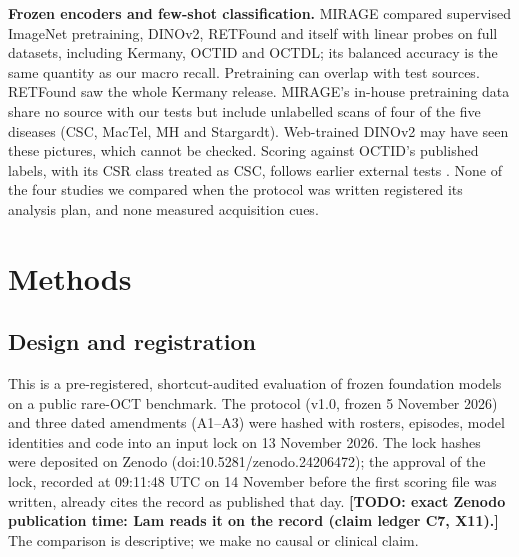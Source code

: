 \documentclass[conference]{IEEEtran}
\newcommand{\todo}[1]{\textbf{[TODO: #1]}}
\begin{document}
\textbf{Frozen encoders and few-shot classification.} MIRAGE \cite{MIRAGE2025} compared supervised ImageNet pretraining, DINOv2, RETFound and itself with linear probes on full datasets, including Kermany, OCTID and OCTDL; its balanced accuracy is the same quantity as our macro recall. Pretraining can overlap with test sources. RETFound saw the whole Kermany release. MIRAGE's in-house pretraining data share no source with our tests but include unlabelled scans of four of the five diseases (CSC, MacTel, MH and Stargardt). Web-trained DINOv2 may have seen these pictures, which cannot be checked.
Scoring against OCTID's \cite{OCTID2020} published labels, with its CSR class treated as CSC, follows earlier external tests \cite{TVST2026,EyeDiff2026}. None of the four studies we compared when the protocol was written registered its analysis plan, and none measured acquisition cues.

\section{Methods}
\label{sec:methods}
\subsection{Design and registration}
\label{sec:design}
This is a pre-registered, shortcut-audited evaluation of frozen foundation models on a public rare-OCT benchmark. The protocol (v1.0, frozen 5 November 2026) and three dated amendments (A1--A3) were hashed with rosters, episodes, model identities and code into an input lock on 13 November 2026.
The lock hashes were deposited on Zenodo (doi:10.5281/zenodo.24206472); the approval of the lock, recorded at 09:11:48 UTC on 14 November before the first scoring file was written, already cites the record as published that day. \todo{exact Zenodo publication time: Lam reads it on the record (claim ledger C7, X11).}
The comparison is descriptive; we make no causal or clinical claim.
\end{document}
